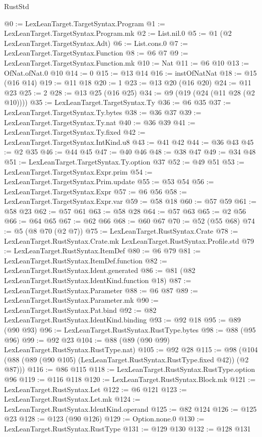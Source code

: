 \begin{lexlean}{RustStd}
\begin{coremodule}
@0 := LexLeanTarget.TargetSyntax.Program
@1 := LexLeanTarget.TargetSyntax.Program.mk
@2 := List.nil.{0}
@5 := @1 (@2 LexLeanTarget.TargetSyntax.Adt)
@6 := List.cons.{0}
@7 := LexLeanTarget.TargetSyntax.Function
@8 := @6 @7
@9 := LexLeanTarget.TargetSyntax.Function.mk
@10 := Nat
@11 := @6 @10
@13 := OfNat.ofNat.{0} @10
@14 := 0
@15 := @13 @14
@16 := instOfNatNat
@18 := @15 (@16 @14)
@19 := @11 @18
@20 := 1
@23 := @13 @20 (@16 @20)
@24 := @11 @23
@25 := 2
@28 := @13 @25 (@16 @25)
@34 := @9 (@19 (@24 (@11 @28 (@2 @10))))
@35 := LexLeanTarget.TargetSyntax.Ty
@36 := @6 @35
@37 := LexLeanTarget.TargetSyntax.Ty.bytes
@38 := @36 @37
@39 := LexLeanTarget.TargetSyntax.Ty.nat
@40 := @36 @39
@41 := LexLeanTarget.TargetSyntax.Ty.fixed
@42 := LexLeanTarget.TargetSyntax.IntKind.u8
@43 := @41 @42
@44 := @36 @43
@45 := @2 @35
@46 := @44 @45
@47 := @40 @46
@48 := @38 @47
@49 := @34 @48
@51 := LexLeanTarget.TargetSyntax.Ty.option @37
@52 := @49 @51
@53 := LexLeanTarget.TargetSyntax.Expr.prim
@54 := LexLeanTarget.TargetSyntax.Prim.update
@55 := @53 @54
@56 := LexLeanTarget.TargetSyntax.Expr
@57 := @6 @56
@58 := LexLeanTarget.TargetSyntax.Expr.var
@59 := @58 @18
@60 := @57 @59
@61 := @58 @23
@62 := @57 @61
@63 := @58 @28
@64 := @57 @63
@65 := @2 @56
@66 := @64 @65
@67 := @62 @66
@68 := @60 @67
@70 := @52 (@55 @68)
@74 := @5 (@8 @70 (@2 @7))
@75 := LexLeanTarget.RustSyntax.Crate
@78 := LexLeanTarget.RustSyntax.Crate.mk LexLeanTarget.RustSyntax.Profile.std
@79 := LexLeanTarget.RustSyntax.ItemDef
@80 := @6 @79
@81 := LexLeanTarget.RustSyntax.ItemDef.function
@82 := LexLeanTarget.RustSyntax.Ident.generated
@86 := @81 (@82 LexLeanTarget.RustSyntax.IdentKind.function @18)
@87 := LexLeanTarget.RustSyntax.Parameter
@88 := @6 @87
@89 := LexLeanTarget.RustSyntax.Parameter.mk
@90 := LexLeanTarget.RustSyntax.Pat.bind
@92 := @82 LexLeanTarget.RustSyntax.IdentKind.binding
@93 := @92 @18
@95 := @89 (@90 @93)
@96 := LexLeanTarget.RustSyntax.RustType.bytes
@98 := @88 (@95 @96)
@99 := @92 @23
@104 := @88 (@89 (@90 @99) LexLeanTarget.RustSyntax.RustType.nat)
@105 := @92 @28
@115 := @98 (@104 (@88 (@89 (@90 @105) (LexLeanTarget.RustSyntax.RustType.fixed @42)) (@2 @87)))
@116 := @86 @115
@118 := LexLeanTarget.RustSyntax.RustType.option @96
@119 := @116 @118
@120 := LexLeanTarget.RustSyntax.Block.mk
@121 := LexLeanTarget.RustSyntax.Let
@122 := @6 @121
@123 := LexLeanTarget.RustSyntax.Let.mk
@124 := LexLeanTarget.RustSyntax.IdentKind.operand
@125 := @82 @124
@126 := @125 @23
@128 := @123 (@90 @126)
@129 := Option.none.{0}
@130 := LexLeanTarget.RustSyntax.RustType
@131 := @129 @130
@132 := @128 @131

\end{coremodule}
\end{lexlean}
